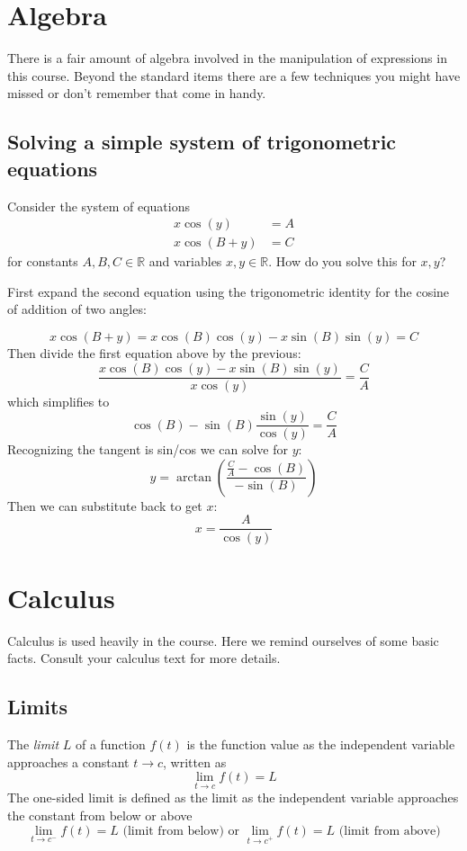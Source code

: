 \section{Algebra}

There is a fair amount of algebra involved in the manipulation of expressions in this course. Beyond the standard items there are a few techniques you might have missed or don't remember that come in handy.

\subsection*{Solving a simple system of trigonometric equations}

Consider the system of equations
\begin{align*}
  x \cos(y) &= A\\
  x \cos(B + y) &= C
\end{align*}
for constants $A,B,C \in \mathbb{R}$ and variables $x,y\in\mathbb{R}$. How do you solve this for $x,y$?

First expand the second equation using the trigonometric identity for the cosine of addition of two angles:

\[
x \cos(B + y) = x \cos(B)\cos(y) - x \sin(B)\sin(y) = C
\]
Then divide the first equation above by the previous:
\[
\frac{x \cos(B)\cos(y) - x \sin(B)\sin(y)}{x \cos(y)} = \frac{C}{A}
\]
which simplifies to
\[
\cos(B) - \sin(B)\frac{\sin(y)}{\cos(y)} = \frac{C}{A}
\]
Recognizing the tangent is sin/cos we can solve for $y$:
\[
y = \arctan\left(\frac{\frac{C}{A}-\cos(B)}{-\sin(B)}\right)
\]
Then we can substitute back to get $x$:
\[
x = \frac{A}{\cos(y)}
\]


\section{Calculus}

Calculus is used heavily in the course. Here we remind ourselves of some basic facts. Consult your calculus text for more details.

\subsection*{Limits}

The \textit{limit} $L$ of a function $f(t)$ is the function value as the independent variable approaches a constant $t\rightarrow c$, written as
\[
\lim_{t\rightarrow c} f(t) = L
\]
The one-sided limit is defined as the limit as the independent variable approaches the constant from below or above
\[
\lim_{t\rightarrow c^-} f(t) = L \mbox{ (limit from below) or } \lim_{t\rightarrow c^+} f(t) = L \mbox{ (limit from above)}
\]

